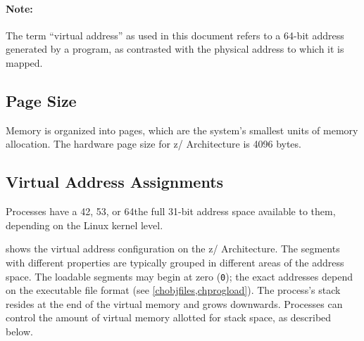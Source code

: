 \documentclass[english,11pt,twoside,toc=bib,toc=idx]{scrreprt}
\newcommand{\ADDRBITS}{64}
\newcommand{\ARCH}{z/\kern-1pt Ar\-chi\-tec\-ture}
\newcommand{\ARCHarch}{\ARCH}
\newcommand{\theARCH}{the \ARCH}
\newcommand{\ADDRBITS}{31}
\newcommand{\ARCH}{ESA/390}
\newcommand{\ARCHarch}{the \ARCH{} ar\-chi\-tec\-ture}
\newcommand{\theARCH}{\ARCHarch}
\begin{document}
\paragraph{Note:}
The term ``virtual address'' as used in this document refers to a
\ADDRBITS{}-bit address generated by a program, as
contrasted with the physical address to which it is mapped.

\subsection{Page Size}
Memory is organized into pages, which are the system's smallest units
of memory allocation.  The hardware page size for \ARCHarch{}
is 4096 bytes.

\subsection{Virtual Address Assignments}
Processes have {\ifzseries a 42, 53, or 64\else the full 31\fi}-bit
address space available to them{\ifzseries, depending on the Linux
  kernel level\fi}.

 shows the virtual address configuration on \theARCH{}.
The segments with different properties are typically
grouped in different areas of the address space.  The loadable segments
may begin at zero (\texttt{0}); the exact addresses depend on the
executable file format (see \cref{chobjfiles,chprogload}).  The process's
stack resides at the end of the virtual memory and grows downwards.
Processes can control the amount of virtual memory allotted for stack
space, as described below.
\end{document}
